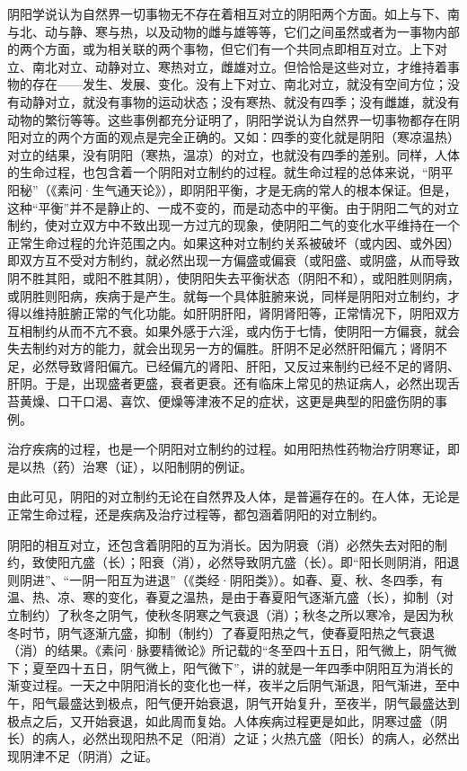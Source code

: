 \documentclass[a4paper,12pt,UTF8,twoside]{ctexbook}
\begin{document}
阴阳学说认为自然界一切事物无不存在着相互对立的阴阳两个方面。如上与下、南与北、动与静、寒与热，以及动物的雌与雄等等，它们之间虽然或者为一事物内部的两个方面，或为相关联的两个事物，但它们有一个共同点即相互对立。上下对立、南北对立、动静对立、寒热对立，雌雄对立。但恰恰是这些对立，才维持着事物的存在——发生、发展、变化。没有上下对立、南北对立，就没有空间方位；没有动静对立，就没有事物的运动状态；没有寒热、就没有四季；没有雌雄，就没有动物的繁衍等等。这些事例都充分证明了，阴阳学说认为自然界一切事物都存在阴阳对立的两个方面的观点是完全正确的。又如：四季的变化就是阴阳（寒凉温热）对立的结果，没有阴阳（寒热，温凉）的对立，也就没有四季的差别。同样，人体的生命过程，也包含着一个阴阳对立制约的过程。就生命过程的总体来说，“阴平阳秘”（《素问·生气通天论》），即阴阳平衡，才是无病的常人的根本保证。但是，这种“平衡”并不是静止的、一成不变的，而是动态中的平衡。由于阴阳二气的对立制约，使对立双方中不致出现一方过亢的现象，使阴阳二气的变化水平维持在一个正常生命过程的允许范围之内。如果这种对立制约关系被破坏（或内因、或外因）即双方互不受对方制约，就必然出现一方偏盛或偏衰（或阳盛、或阴盛，从而导致阴不胜其阳，或阳不胜其阴），使阴阳失去平衡状态（阴阳不和），或阳胜则阴病，或阴胜则阳病，疾病于是产生。就每一个具体脏腑来说，同样是阴阳对立制约，才得以维持脏腑正常的气化功能。如肝阴肝阳，肾阴肾阳等，正常情况下，阴阳双方互相制约从而不亢不衰。如果外感于六淫，或内伤于七情，使阴阳一方偏衰，就会失去制约对方的能力，就会出现另一方的偏胜。肝阴不足必然肝阳偏亢；肾阴不足，必然导致肾阳偏亢。已经偏亢的肾阳、肝阳，又反过来制约已经不足的肾阴、肝阴。于是，出现盛者更盛，衰者更衰。还有临床上常见的热证病人，必然出现舌苔黄燥、口干口渴、喜饮、便燥等津液不足的症状，这更是典型的阳盛伤阴的事例。

治疗疾病的过程，也是一个阴阳对立制约的过程。如用阳热性药物治疗阴寒证，即是以热（药）治寒（证），以阳制阴的例证。

由此可见，阴阳的对立制约无论在自然界及人体，是普遍存在的。在人体，无论是正常生命过程，还是疾病及治疗过程等，都包涵着阴阳的对立制约。

阴阳的相互对立，还包含着阴阳的互为消长。因为阴衰（消）必然失去对阳的制约，致使阳亢盛（长）；阳衰（消），必然导致阴亢盛（长）。即“阳长则阴消，阳退则阴进”、“一阴一阳互为进退”（《类经·阴阳类》）。如春、夏、秋、冬四季，有温、热、凉、寒的变化，春夏之温热，是由于春夏阳气逐渐亢盛（长），抑制（对立制约）了秋冬之阴气，使秋冬阴寒之气衰退（消）；秋冬之所以寒冷，是因为秋冬时节，阴气逐渐亢盛，抑制（制约）了春夏阳热之气，使春夏阳热之气衰退（消）的结果。《素问·脉要精微论》所记载的“冬至四十五日，阳气微上，阴气微下；夏至四十五日，阴气微上，阳气微下”，讲的就是一年四季中阴阳互为消长的渐变过程。一天之中阴阳消长的变化也一样，夜半之后阴气渐退，阳气渐进，至中午，阳气最盛达到极点，阳气便开始衰退，阴气开始复升，至夜半，阴气最盛达到极点之后，又开始衰退，如此周而复始。人体疾病过程更是如此，阴寒过盛（阴长）的病人，必然出现阳热不足（阳消）之证；火热亢盛（阳长）的病人，必然出现阴津不足（阴消）之证。
\end{document}

